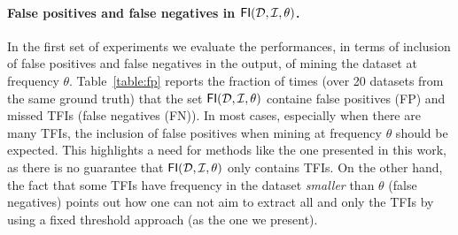 \paragraph*{False positives and false negatives in
$\mathsf{FI}({\cal D},{\cal I},\theta)$.}
In the first set of experiments we evaluate the performances, in terms of
inclusion of false positives and false negatives in the output, of mining the
dataset at frequency $\theta$. Table~\ref{table:fp} reports
the fraction of times (over 20 datasets from the same
ground truth) that the set $\mathsf{FI}({\cal D},{\cal I},\theta)$ containe false positives
(FP) and missed TFIs (false negatives (FN)). In most cases, especially when there are
many TFIs, the inclusion of false positives when mining at frequency $\theta$
should be expected. This highlights a need for methods like the one presented in
this work, as there is no guarantee that $\mathsf{FI}({\cal D},{\cal I},\theta)$
only contains TFIs. On the other hand,
the fact that some TFIs have frequency in the dataset \emph{smaller} than
$\theta$ (false negatives) points out how one can not aim to extract all and
only the TFIs by using a fixed threshold approach (as the one we present).

